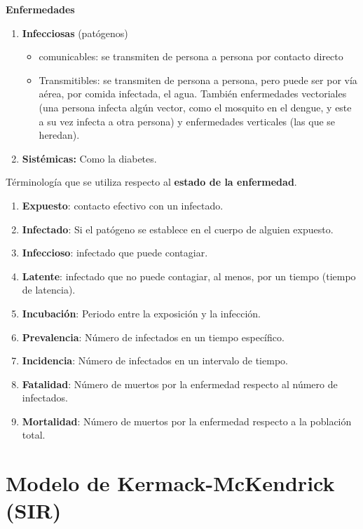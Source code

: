 \documentclass[10pt,oneside]{article}
\begin{document}
\begin{multicols}{2}
    \textbf{Enfermedades}
    
    \begin{enumerate}
        \item \textbf{Infecciosas} (patógenos)
        \begin{itemize}
            \item comunicables: se transmiten de persona a persona por contacto directo 
            \item Transmitibles: se transmiten de persona a persona, pero puede ser por vía aérea, por comida infectada, el agua. También enfermedades vectoriales (una persona infecta algún vector, como el mosquito en el dengue, y este a su vez infecta a otra persona) y enfermedades verticales (las que se heredan). 
        \end{itemize} 
        \item \textbf{Sistémicas:} Como la diabetes.
    \end{enumerate} 
    
    Términología que se utiliza respecto al \textbf{estado de la enfermedad}.
    
    \begin{enumerate}
        \item \textbf{Expuesto}: contacto efectivo con un infectado.
        \item \textbf{Infectado}: Si el patógeno se establece en el cuerpo de alguien expuesto. 
        \item \textbf{Infeccioso}: infectado que puede contagiar.
        \item \textbf{Latente}: infectado que no puede contagiar, al menos, por un tiempo (tiempo de latencia).
        \item \textbf{Incubación}: Periodo entre la exposición y la infección.
        \item \textbf{Prevalencia}: Número de infectados en un tiempo específico.
        \item \textbf{Incidencia}: Número de infectados en un intervalo de tiempo.
        \item \textbf{Fatalidad}: Número de muertos por la enfermedad respecto al número de infectados.
        \item \textbf{Mortalidad}: Número de muertos por la enfermedad respecto a la población total.
    \end{enumerate}

    \section{Modelo de Kermack-McKendrick (SIR)}


\end{multicols}
\end{document}
